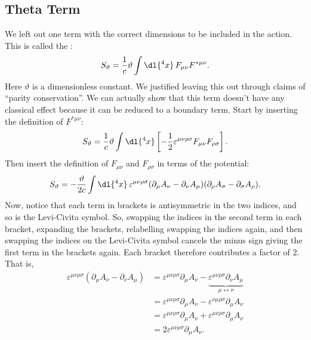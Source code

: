 \documentclass[fleqn]{NotesClass}
\begin{document}
    \subsection{Theta Term}
    We left out one term with the correct dimensions to be included in the action.
    This is called the :
    \begin{equation}
        S_{\vartheta} = \frac{1}{c} \vartheta \int\dl{^4x} \, F_{\mu\nu} F^{*\mu\nu}.
    \end{equation}
    Here \(\vartheta\) is a dimensionless constant.
    We justified leaving this out through claims of \enquote{parity conservation}.
    We can actually show that this term doesn't have any classical effect because it can be reduced to a boundary term.
    Start by inserting the definition of \(F^{*\mu\nu}\):
    \begin{equation}
        S_{\vartheta} = \frac{1}{c}\vartheta \int \dl{^4x} \left[ -\frac{1}{2} \varepsilon^{\mu\nu\rho\sigma} F_{\mu\nu}F_{\rho\sigma} \right].
    \end{equation}
    Then insert the definition of \(F_{\mu\nu}\) and \(F_{\rho\sigma}\) in terms of the potential:
    \begin{equation}
        S_{\vartheta} = -\frac{\vartheta}{2c} \int \dl{^4x}  \, \varepsilon^{\mu\nu\rho\sigma}(\partial_\mu A_\nu - \partial_\nu A_\mu)(\partial_\rho A_\sigma - \partial_\sigma A_\rho).
    \end{equation}
    Now, notice that each term in brackets is antisymmetric in the two indices, and so is the Levi-Civita symbol.
    So, swapping the indices in the second term in each bracket, expanding the brackets, relabelling swapping the indices again, and then swapping the indices on the Levi-Civita symbol cancels the minus sign giving the first term in the brackets again.
    Each bracket therefore contributes a factor of 2.
    That is,
    \begin{align}
        \varepsilon^{\mu\nu\rho\sigma} (\partial_\mu A_\nu - \partial_\nu A_\mu) &= \varepsilon^{\mu\nu\rho\sigma}\partial_\mu A_\nu - \underbrace{\varepsilon^{\mu\nu\rho\sigma} \partial_\nu A_\mu}_{\mu \leftrightarrow \nu}\\
        &= \varepsilon^{\mu\nu\rho\sigma}\partial_\mu A_\nu - \varepsilon^{\nu\mu\rho\sigma}\partial_\mu A_\nu\\
        &= \varepsilon^{\mu\nu\rho\sigma}\partial_\mu A_\nu + \varepsilon^{\mu\nu\rho\sigma}\partial_\mu A_\nu\\
        &= 2\varepsilon^{\mu\nu\rho\sigma}\partial_\mu A_\nu.
    \end{align}
\end{document}
